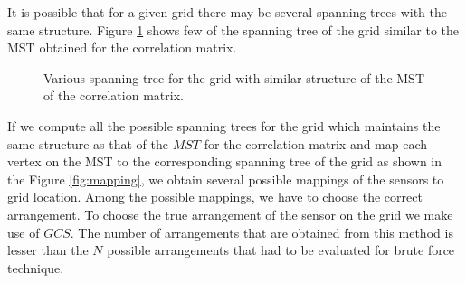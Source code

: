 It is possible that for a given grid there may be several spanning trees with the same structure. 
Figure \ref{fig:variousMappings} shows few of the spanning tree of the grid similar to the MST obtained for the correlation matrix.
\begin{figure}[!ht]

\caption{Various spanning tree for the grid with similar structure of the MST of the correlation matrix.}
\label{fig:variousMappings}
\end{figure}


If we compute all the possible spanning trees for the grid which maintains the same structure as that of the $MST$ for the correlation matrix and map each vertex on the MST to the corresponding spanning tree of the grid as shown in the Figure \ref{fig:mapping}, we obtain several possible mappings of the sensors to grid location. Among the possible mappings, we have to choose the correct arrangement. To choose the true arrangement of the sensor on the grid we make use of $GCS$. 
The number of arrangements that are obtained from this method is lesser than the ${N}$  possible arrangements that had to be evaluated for brute force technique.

